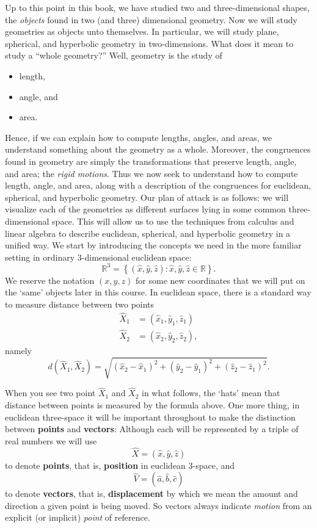\documentclass{ximera}
\begin{document}
Up to this point in this book, we have studied two and three-dimensional shapes, the \textit{objects} found in two (and three) dimensional geometry. Now we will study geometries as objects unto themselves. In particular, we will study plane, spherical, and hyperbolic geometry in two-dimensions. What does it mean to study a ``whole geometry?'' Well, geometry is the study of 
\begin{itemize}
\item length,
\item angle, and
\item area.
\end{itemize}
Hence, if we can explain how to compute lengths, angles, and areas, we
understand something about the geometry as a whole. Moreover, the
congruences found in geometry are simply the transformations that
preserve length, angle, and area; the \textit{rigid motions}. Thus we
now seek to understand how to compute length, angle, and area, along
with a description of the congruences for euclidean, spherical, and
hyperbolic geometry.  Our plan of attack is as follows: we will
visualize each of the geometries as different surfaces lying in some
common three-dimensional space. This will allow us to use the
techniques from calculus and linear algebra to describe euclidean,
spherical, and hyperbolic geometry in a unified way. We start by
introducing the concepts we need in the more familiar setting in
ordinary $3$-dimensional euclidean space:
\[
\mathbb{R}^{3}=\left\{  \left(  \hat{x},\hat{y},\hat{z}\right)  :\hat{x}%
,\hat{y},\hat{z}\in\mathbb{R}\right\}.
\]
We reserve the notation $\left( x,y,z\right) $ for some new
coordinates that we will put on the `same' objects later in this
course. In euclidean space, there is a standard way to measure
distance between two points%
\begin{align*}
\hat{X}_{1}  &  =\left(  \hat{x}_{1},\hat{y}_{1},\hat{z}_{1}\right) \\
\hat{X}_{2}  &  =\left(  \hat{x}_{2},\hat{y}_{2},\hat{z}_{2}\right)  ,
\end{align*}
namely%
\[
d\left(  \hat{X}_{1},\hat{X}_{2}\right)  =\sqrt{\left(  \hat{x}_{2}-\hat
{x}_{1}\right)  ^{2}+\left(  \hat{y}_{2}-\hat{y}_{1}\right)  ^{2}+\left(
\hat{z}_{2}-\hat{z}_{1}\right)  ^{2}}. \label{0}%
\]

When you see two point $\hat{X}_1$ and $\hat{X}_2$ in what follows,
the `hats' mean that distance between points is measured by the
formula above. One more thing, in euclidean three-space it will be
important throughout to make the distinction between \textbf{points}
and \textbf{vectors}: Although each will be represented by a triple of
real numbers we will use%
\[
\hat{X}=\left(  \hat{x},\hat{y},\hat{z}\right)
\]
to denote \textbf{points}, that is, \textbf{position} in euclidean $3$-space,
and%
\[
\hat{V}=\left(  \hat{a},\hat{b},\hat{c}\right)
\]
to denote \textbf{vectors}, that is, \textbf{displacement} by which we mean
the amount and direction a given point is being moved. So vectors always
indicate \textit{motion} from an explicit (or implicit) \textit{point} of
reference. 
\end{document}
